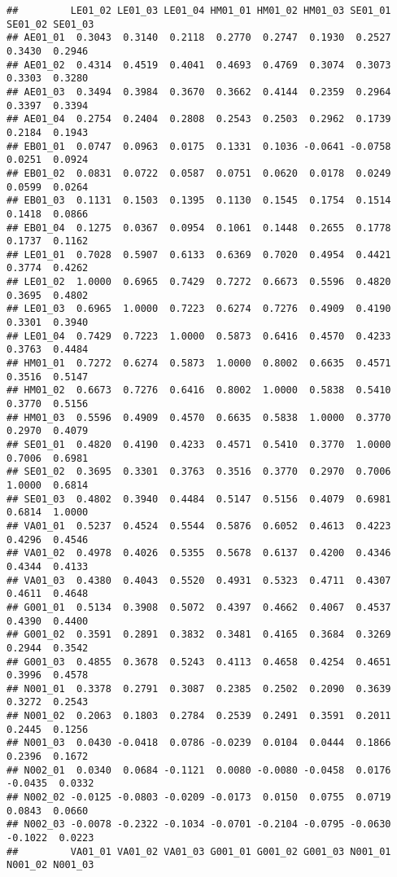 \documentclass[
]{article}
\begin{document}
\begin{verbatim}
##         LE01_02 LE01_03 LE01_04 HM01_01 HM01_02 HM01_03 SE01_01 SE01_02 SE01_03
## AE01_01  0.3043  0.3140  0.2118  0.2770  0.2747  0.1930  0.2527  0.3430  0.2946
## AE01_02  0.4314  0.4519  0.4041  0.4693  0.4769  0.3074  0.3073  0.3303  0.3280
## AE01_03  0.3494  0.3984  0.3670  0.3662  0.4144  0.2359  0.2964  0.3397  0.3394
## AE01_04  0.2754  0.2404  0.2808  0.2543  0.2503  0.2962  0.1739  0.2184  0.1943
## EB01_01  0.0747  0.0963  0.0175  0.1331  0.1036 -0.0641 -0.0758  0.0251  0.0924
## EB01_02  0.0831  0.0722  0.0587  0.0751  0.0620  0.0178  0.0249  0.0599  0.0264
## EB01_03  0.1131  0.1503  0.1395  0.1130  0.1545  0.1754  0.1514  0.1418  0.0866
## EB01_04  0.1275  0.0367  0.0954  0.1061  0.1448  0.2655  0.1778  0.1737  0.1162
## LE01_01  0.7028  0.5907  0.6133  0.6369  0.7020  0.4954  0.4421  0.3774  0.4262
## LE01_02  1.0000  0.6965  0.7429  0.7272  0.6673  0.5596  0.4820  0.3695  0.4802
## LE01_03  0.6965  1.0000  0.7223  0.6274  0.7276  0.4909  0.4190  0.3301  0.3940
## LE01_04  0.7429  0.7223  1.0000  0.5873  0.6416  0.4570  0.4233  0.3763  0.4484
## HM01_01  0.7272  0.6274  0.5873  1.0000  0.8002  0.6635  0.4571  0.3516  0.5147
## HM01_02  0.6673  0.7276  0.6416  0.8002  1.0000  0.5838  0.5410  0.3770  0.5156
## HM01_03  0.5596  0.4909  0.4570  0.6635  0.5838  1.0000  0.3770  0.2970  0.4079
## SE01_01  0.4820  0.4190  0.4233  0.4571  0.5410  0.3770  1.0000  0.7006  0.6981
## SE01_02  0.3695  0.3301  0.3763  0.3516  0.3770  0.2970  0.7006  1.0000  0.6814
## SE01_03  0.4802  0.3940  0.4484  0.5147  0.5156  0.4079  0.6981  0.6814  1.0000
## VA01_01  0.5237  0.4524  0.5544  0.5876  0.6052  0.4613  0.4223  0.4296  0.4546
## VA01_02  0.4978  0.4026  0.5355  0.5678  0.6137  0.4200  0.4346  0.4344  0.4133
## VA01_03  0.4380  0.4043  0.5520  0.4931  0.5323  0.4711  0.4307  0.4611  0.4648
## G001_01  0.5134  0.3908  0.5072  0.4397  0.4662  0.4067  0.4537  0.4390  0.4400
## G001_02  0.3591  0.2891  0.3832  0.3481  0.4165  0.3684  0.3269  0.2944  0.3542
## G001_03  0.4855  0.3678  0.5243  0.4113  0.4658  0.4254  0.4651  0.3996  0.4578
## N001_01  0.3378  0.2791  0.3087  0.2385  0.2502  0.2090  0.3639  0.3272  0.2543
## N001_02  0.2063  0.1803  0.2784  0.2539  0.2491  0.3591  0.2011  0.2445  0.1256
## N001_03  0.0430 -0.0418  0.0786 -0.0239  0.0104  0.0444  0.1866  0.2396  0.1672
## N002_01  0.0340  0.0684 -0.1121  0.0080 -0.0080 -0.0458  0.0176 -0.0435  0.0332
## N002_02 -0.0125 -0.0803 -0.0209 -0.0173  0.0150  0.0755  0.0719  0.0843  0.0660
## N002_03 -0.0078 -0.2322 -0.1034 -0.0701 -0.2104 -0.0795 -0.0630 -0.1022  0.0223
##         VA01_01 VA01_02 VA01_03 G001_01 G001_02 G001_03 N001_01 N001_02 N001_03

\end{verbatim}
\end{document}
